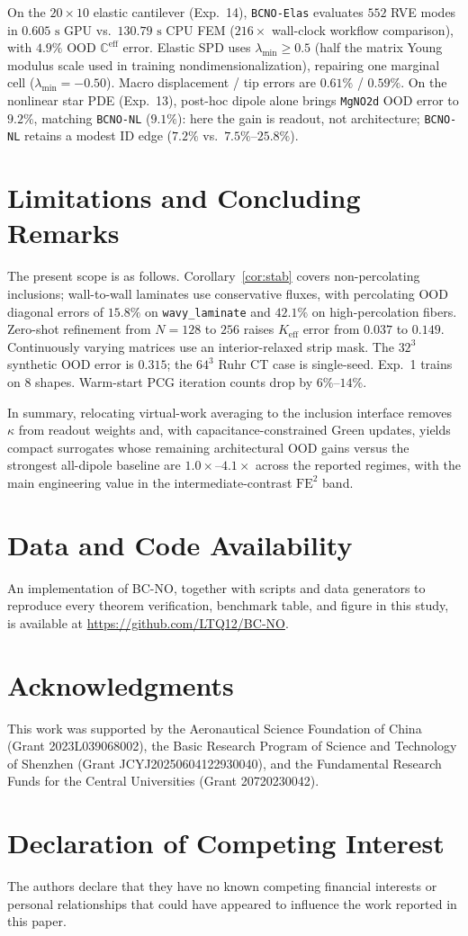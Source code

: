 \documentclass[preprint,11pt]{elsarticle}
\newcommand{\Keff}{K_{\mathrm{eff}}}
\newcommand{\Ceff}{\mathbb{C}^{\mathrm{eff}}}
\begin{document}
On the $20\times 10$ elastic cantilever (Exp.~14), \texttt{BCNO-Elas} evaluates $552$ RVE modes in $0.605\text{ s}$ GPU vs.\ $130.79\text{ s}$ CPU FEM ($216\times$ wall-clock workflow comparison), with $4.9\%$ OOD $\Ceff$ error. Elastic SPD uses $\lambda_{\min}\ge 0.5$ (half the matrix Young modulus scale used in training nondimensionalization), repairing one marginal cell ($\lambda_{\min}=-0.50$). Macro displacement / tip errors are $0.61\%$ / $0.59\%$. On the nonlinear star PDE (Exp.~13), post-hoc dipole alone brings \texttt{MgNO2d} OOD error to $9.2\%$, matching \texttt{BCNO-NL} ($9.1\%$): here the gain is readout, not architecture; \texttt{BCNO-NL} retains a modest ID edge ($7.2\%$ vs.\ $7.5\%$--$25.8\%$).

\section{Limitations and Concluding Remarks}\label{sec:conclusion}

The present scope is as follows. Corollary~\ref{cor:stab} covers non-percolating inclusions; wall-to-wall laminates use conservative fluxes, with percolating OOD diagonal errors of $15.8\%$ on \texttt{wavy\_laminate} and $42.1\%$ on high-percolation fibers. Zero-shot refinement from $N=128$ to $256$ raises $\Keff$ error from $0.037$ to $0.149$. Continuously varying matrices use an interior-relaxed strip mask. The $32^3$ synthetic OOD error is $0.315$; the $64^3$ Ruhr CT case is single-seed. Exp.~1 trains on 8 shapes. Warm-start PCG iteration counts drop by $6\%$--$14\%$.

In summary, relocating virtual-work averaging to the inclusion interface removes $\kappa$ from readout weights and, with capacitance-constrained Green updates, yields compact surrogates whose remaining architectural OOD gains versus the strongest all-dipole baseline are $1.0\times$--$4.1\times$ across the reported regimes, with the main engineering value in the intermediate-contrast $\mathrm{FE}^2$ band.

\section*{Data and Code Availability}
An implementation of BC-NO, together with scripts and data generators to reproduce every theorem verification, benchmark table, and figure in this study, is available at \url{https://github.com/LTQ12/BC-NO}.

\section*{Acknowledgments}
This work was supported by the Aeronautical Science Foundation of China (Grant 2023L039068002), the Basic Research Program of Science and Technology of Shenzhen (Grant JCYJ20250604122930040), and the Fundamental Research Funds for the Central Universities (Grant 20720230042).

\section*{Declaration of Competing Interest}
The authors declare that they have no known competing financial interests or personal relationships that could have appeared to influence the work reported in this paper.



\end{document}
